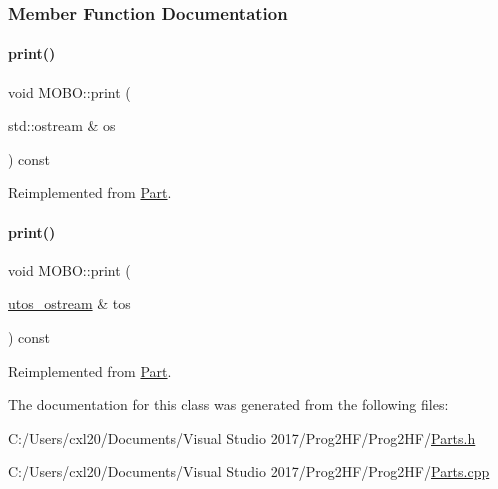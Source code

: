 \subsubsection{Member Function Documentation}
\mbox{\label{class_m_o_b_o_a3241f425030e01d5b7a192c23af2dbda}} 
\paragraph{\texorpdfstring{print()}{print()}\hspace{0.1cm}{\footnotesize\ttfamily [1/2]}}
{\footnotesize\ttfamily void M\+O\+B\+O\+::print (\begin{DoxyParamCaption}\item[{std\+::ostream \&}]{os }\end{DoxyParamCaption}) const\hspace{0.3cm}{\ttfamily [virtual]}}



Reimplemented from \mbox{\hyperlink{class_part_a4fa402b8e8fd4236ff773a7697ab2bc3}{Part}}.

\mbox{\label{class_m_o_b_o_a4c78cec3a2a3e4d4480855622f50bd06}} 
\paragraph{\texorpdfstring{print()}{print()}\hspace{0.1cm}{\footnotesize\ttfamily [2/2]}}
{\footnotesize\ttfamily void M\+O\+B\+O\+::print (\begin{DoxyParamCaption}\item[{\mbox{\hyperlink{structutos__ostream}{utos\+\_\+ostream}} \&}]{tos }\end{DoxyParamCaption}) const\hspace{0.3cm}{\ttfamily [virtual]}}



Reimplemented from \mbox{\hyperlink{class_part_a9ecabe44ba3415badf82c6a23617a41e}{Part}}.



The documentation for this class was generated from the following files\+:\begin{DoxyCompactItemize}
\item 
C\+:/\+Users/cxl20/\+Documents/\+Visual Studio 2017/\+Prog2\+H\+F/\+Prog2\+H\+F/\mbox{\hyperlink{_parts_8h}{Parts.\+h}}\item 
C\+:/\+Users/cxl20/\+Documents/\+Visual Studio 2017/\+Prog2\+H\+F/\+Prog2\+H\+F/\mbox{\hyperlink{_parts_8cpp}{Parts.\+cpp}}\end{DoxyCompactItemize}
